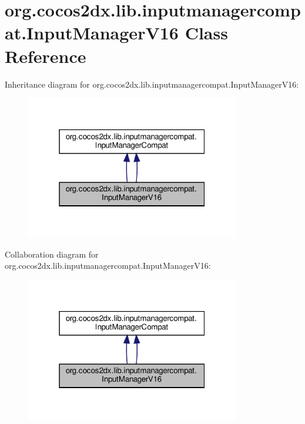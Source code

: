 \hypertarget{classorg_1_1cocos2dx_1_1lib_1_1inputmanagercompat_1_1InputManagerV16}{}\section{org.\+cocos2dx.\+lib.\+inputmanagercompat.\+Input\+Manager\+V16 Class Reference}
\label{classorg_1_1cocos2dx_1_1lib_1_1inputmanagercompat_1_1InputManagerV16}


Inheritance diagram for org.\+cocos2dx.\+lib.\+inputmanagercompat.\+Input\+Manager\+V16\+:
\nopagebreak
\begin{figure}[H]
\begin{center}
\leavevmode
\includegraphics[width=265pt]{classorg_1_1cocos2dx_1_1lib_1_1inputmanagercompat_1_1InputManagerV16__inherit__graph}
\end{center}
\end{figure}


Collaboration diagram for org.\+cocos2dx.\+lib.\+inputmanagercompat.\+Input\+Manager\+V16\+:
\nopagebreak
\begin{figure}[H]
\begin{center}
\leavevmode
\includegraphics[width=265pt]{classorg_1_1cocos2dx_1_1lib_1_1inputmanagercompat_1_1InputManagerV16__coll__graph}
\end{center}
\end{figure}
